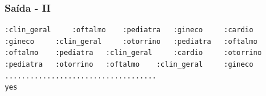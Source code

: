 
\begin{frame}[fragile]

\frametitle{Saída - II}

\begin{footnotesize}
\begin{verbatim}
:clin_geral 	:oftalmo 	:pediatra 	:gineco 	:cardio 	
:gineco 	:clin_geral 	:otorrino 	:pediatra 	:oftalmo 	
:oftalmo 	:pediatra 	:clin_geral 	:cardio 	:otorrino 	
:pediatra 	:otorrino 	:oftalmo 	:clin_geral 	:gineco 	
....................................
yes
\end{verbatim}
  
\end{footnotesize}
\end{frame}

